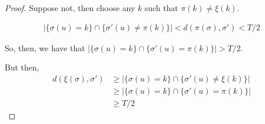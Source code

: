 \begin{proof}
Suppose not, then choose any $k$ such that $\pi(k) \neq \xi(k)$. 

\begin{align*}
| \{ \sigma(u) = k \} \cap \{ \sigma'(u) \neq \pi(k) \} | < d(\pi(\sigma), \sigma') < T/2
\end{align*}

So, then, we have that $| \{ \sigma(u) = k \} \cap \{ \sigma'(u) = \pi(k) \}| > T/2$. 

But then,
\begin{align*}
d(\xi(\sigma), \sigma') &\geq | \{ \sigma(u) = k \} \cap \{\sigma'(u) \neq \xi(k) \} | \\
   &\geq | \{ \sigma(u) = k\} \cap \{ \sigma'(u) = \pi(k) \}| \\ 
   &\geq T/2
\end{align*}

\end{proof}






